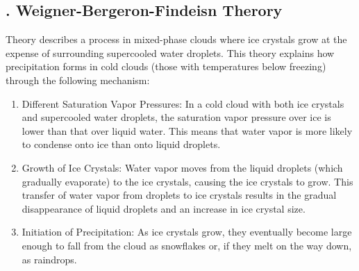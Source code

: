 \documentclass[fleqn,10pt]{SelfArx} %
\begin{document}
\begin{figure}[ht]
    \centering
\end{figure}

\subsection{. Weigner-Bergeron-Findeisn Therory}
Theory describes a process in mixed-phase clouds where ice crystals grow at the expense of surrounding supercooled water droplets. This theory explains how precipitation forms in cold clouds (those with temperatures below freezing) through the following mechanism:

\begin{enumerate}
    \item Different Saturation Vapor Pressures: In a cold cloud with both ice crystals and supercooled water droplets, the saturation vapor pressure over ice is lower than that over liquid water. This means that water vapor is more likely to condense onto ice than onto liquid droplets.
    \item Growth of Ice Crystals: Water vapor moves from the liquid droplets (which gradually evaporate) to the ice crystals, causing the ice crystals to grow. This transfer of water vapor from droplets to ice crystals results in the gradual disappearance of liquid droplets and an increase in ice crystal size.
    \item Initiation of Precipitation: As ice crystals grow, they eventually become large enough to fall from the cloud as snowflakes or, if they melt on the way down, as raindrops.
\end{enumerate}
\end{document}
